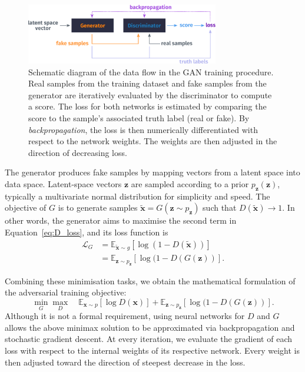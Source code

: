 \begin{figure}
    \centering
    \hspace{-2cm}
    \includegraphics[width=0.75\textwidth]{chapter4/gan_diagram.pdf}
    \caption{
        Schematic diagram of the data flow in the GAN training procedure. Real samples from the training dataset and fake samples from the generator
        are iteratively evaluated by the discriminator to compute a score. The loss for
        both networks is estimated by comparing the score to the sample's associated
        truth label (real or fake). By \emph{backpropagation}, the loss is then
        numerically differentiated with respect to the network weights. The
        weights are then adjusted in the direction of decreasing loss.
    }
    \label{fig:gan_diagram}
\end{figure}


The generator produces fake samples by mapping vectors from a latent space into
data space. Latent-space vectors $\bm{z}$ are sampled according to a prior
$p_{\bm{z}}(\bm{z})$, typically a multivariate normal distribution for
simplicity and speed. The objective of $G$ is to generate samples
$\tilde{\bm{x}} = G(\bm{z} \sim p_{\bm{z}})$ such that
$D(\tilde{\bm{x}}) \rightarrow 1$. In other words, the generator aims to
maximise the second term in Equation~\ref{eq:D_loss}, and its loss function is
\begin{align}\label{eq:GAN_gen}
    \mathcal{L}_G & =
    \mathbb{E}_{\tilde{\bm{x}} \sim g} [ \log( 1 - D(\tilde{\bm{x}}) )]\nonumber        \\
                  & = \mathbb{E}_{\bm{z} \sim p_{\bm{z}}} [ \log( 1 - D(G(\bm{z}) )].
\end{align}

Combining these minimisation tasks, we obtain the mathematical formulation of
the adversarial training objective:
\begin{equation}\label{eq:GAN}
    \min_G \max_D \quad
    \mathbb{E}_{\bm{x} \sim p} [ \log D(\bm{x}) ] +
    \mathbb{E}_{\bm{z} \sim p_{\bm{z}}} [ \log( 1 - D(G(\bm{z}) )].
\end{equation}
Although it is not a formal requirement, using neural networks for $D$ and $G$
allows the above minimax solution to be approximated via backpropagation and
stochastic gradient descent. At every iteration, we evaluate the gradient of
each loss with respect to the internal weights of its respective network. Every
weight is then adjusted toward the direction of steepest decrease in the loss.



